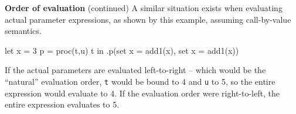 \begin{minipage}[t]{\sw}
\slidenumber
\LARGE
{\bf Order of evaluation} (continued)\exx
A similar situation exists
when evaluating actual parameter expressions,
as shown by this example, assuming call-by-value semantics.
{\Large
\begin{qv}
let
  x = 3
  p = proc(t,u) t
in
  .p(set x = add1(x), set x = add1(x))
\end{qv}
}
If the actual parameters are evaluated left-to-right --
which would be the ``natural'' evaluation order,
\verb't' would be bound to 4 and \verb'u' to 5,
so the entire expression would evaluate to 4.
If the evaluation order were right-to-left,
the entire expression evaluates to 5.\exx
\end{minipage}
\clearpage
